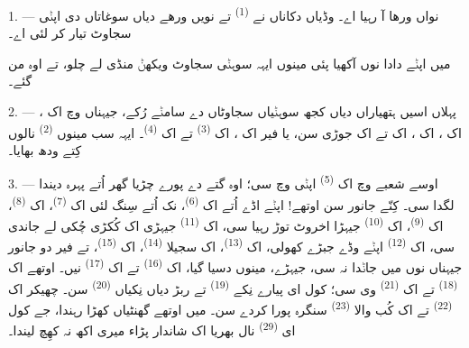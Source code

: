 %
%

\VUsaut{4.0mm}
\VUsaut{2.0mm}
\VUsaut{3.4mm}

1. --- نواں ورھا آ رہیا اے۔ وڈیاں دکاناں نے  \textsuperscript{(1)}
تے نویں ورھے دیاں سوغاتاں دی اپݨی سجاوٹ تیار کر لئی اے۔

میں اپݨے دادا نوں آکھیا پئی مینوں ایہہ سوہݨی سجاوٹ ویکھݨ منڈی لے چلو، تے اوہ من
گئے۔

2. --- پہلاں اسیں ہتھیاراں دیاں کجھ سوہݨیاں سجاوٹاں دے سامݨے رُکے، جیہناں وچ اک
، اک ، اک ، اک
 تے اک جوڑی  سن، یا فیر اک
، اک  \textsuperscript{(3)} تے اک
 \textsuperscript{(4)}۔ ایہہ سب مینوں 
\textsuperscript{(2)} نالوں کِتے ودھ بھایا۔

\VUsaut{3.0mm}
\VUsaut{2.6mm}

3. --- اوسے شعبے وچ اک  \textsuperscript{(5)} اپݨی
 وچ سی؛ اوہ گتے دے پورے چڑیا گھر اُتے پہرہ دیندا لگدا سی۔
کِنّے جانور سن اوتھے! اپݨے اڈے اُتے اک  \textsuperscript{(6)}، نک اُتے
سِنگ لئی اک  \textsuperscript{(7)}، اک 
\textsuperscript{(8)}، اک  \textsuperscript{(9)}، اک 
\textsuperscript{(10)} جیہڑا اخروٹ توڑ رہیا سی، اک 
\textsuperscript{(11)} جیہڑی اک کُکڑی چُکی لے جاندی سی، اک 
\textsuperscript{(12)} اپݨے وڈے جبڑے کھولی، اک  \textsuperscript{(13)}،
اک سجیلا  \textsuperscript{(14)}، اک 
\textsuperscript{(15)}، تے فیر دو جانور جیہناں نوں میں جاݨدا نہ سی، جیہڑے، مینوں
دسیا گیا، اک  \textsuperscript{(16)} تے اک 
\textsuperscript{(17)} نیں۔ اوتھے اک  \textsuperscript{(18)} تے اک
 \textsuperscript{(21)} وی سی؛ کول ای پیارے نِکے 
\textsuperscript{(19)} تے ربڑ دیاں نِکیاں  \textsuperscript{(20)}
سن۔ چھیکر اک  \textsuperscript{(22)} تے اک کُب والا
 \textsuperscript{(23)} سنگرہ پورا کردے سن۔ میں اوتھے گھنٹیاں کھڑا
رہندا، جے کول ای  \textsuperscript{(29)} نال بھریا اک شاندار
پڑاء میری اکھ نہ کھِچ لیندا۔

